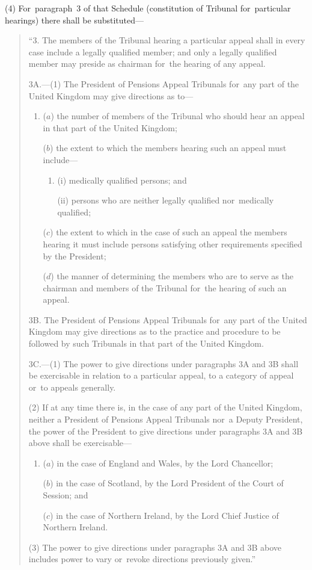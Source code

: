 \documentclass[12pt,a4paper]{article}
\begin{document}
(4) For~paragraph~3 of that Schedule (constitution of Tribunal for~particular hearings) there shall be substituted—
\begin{quotation}
“3. The members of the Tribunal hearing a particular appeal shall in every case include a legally qualified member; and only a legally qualified member may preside as chairman for~the hearing of any appeal.

\medskip

3A.---(1) The President of Pensions Appeal Tribunals for~any part of the United Kingdom may give directions as to—
\begin{enumerate}\item[]
($a$) the number of members of the Tribunal who should hear an appeal in that part of the United Kingdom;

($b$) the extent to which the members hearing such an appeal must include—
\begin{enumerate}\item[]
(i) medically qualified persons; and

(ii) persons who are neither legally qualified nor~medically qualified;
\end{enumerate}

($c$) the extent to which in the case of such an appeal the members hearing it must include persons satisfying other requirements specified by the President;

($d$) the manner of determining the members who are to serve as the chairman and members of the Tribunal for~the hearing of such an appeal.
\end{enumerate}

\medskip

3B. The President of Pensions Appeal Tribunals for~any part of the United Kingdom may give directions as to the practice and procedure to be followed by such Tribunals in that part of the United Kingdom.

\medskip

3C.---(1) The power to give directions under paragraphs 3A and 3B shall be exercisable in relation to a particular appeal, to a category of appeal or~to appeals generally.

(2) If at any time there is, in the case of any part of the United Kingdom, neither a President of Pensions Appeal Tribunals nor~a Deputy President, the power of the President to give directions under paragraphs 3A and 3B above shall be exercisable—
\begin{enumerate}\item[]
($a$) in the case of England and Wales, by the Lord Chancellor;

($b$) in the case of Scotland, by the Lord President of the Court of Session; and

($c$) in the case of Northern Ireland, by the Lord Chief Justice of Northern Ireland.
\end{enumerate}

(3) The power to give directions under paragraphs 3A and 3B above includes power to vary or~revoke directions previously given.”
\end{quotation}
\end{document}
